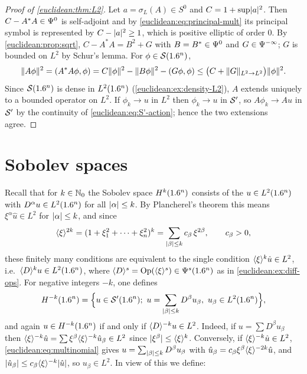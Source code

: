 \begin{proof}[Proof of \cref{euclidean:thm:L2}]
  Let $a=\sigma_L(A)\in S^0$ and $C=1+\sup\lvert a\rvert^2$. Then $C-A^*A\in\Psi^{0}$ is
  self-adjoint and by \eqref{euclidean:eq:principal-mult} its principal symbol
  is represented by $C-\lvert a\rvert^2\ge1$, which is positive elliptic of order
  $0$. By \cref{euclidean:prop:sqrt}, $C-A^*A=B^2+G$ with $B=B^*\in\Psi^{0}$
  and $G\in\Psi^{-\infty}$; $G$ is bounded on $L^2$ by Schur's lemma. For
  $\phi\in\mathcal{S}(1.6^n)$,
  \begin{equation*}
    \lVert A\phi\rVert^2=( A^*A\phi, \phi)=C\lVert \phi\rVert^2-\lVert B\phi\rVert^2-( G\phi, \phi)
    \le\bigl(C+\lVert G\rVert_{L^2\to L^2}\bigr)\lVert \phi\rVert^2.
  \end{equation*}
  Since $\mathcal{S}(1.6^n)$ is dense in $L^2(1.6^n)$ (\cref{euclidean:ex:density-L2}),
  $A$ extends uniquely to a bounded operator on $L^2$. If $\phi_k\to u$ in
  $L^2$ then $\phi_k\to u$ in $\mathcal{S}'$, so $A\phi_k\to Au$ in $\mathcal{S}'$ by the
  continuity of \eqref{euclidean:eq:S'-action}; hence the two extensions agree.
\end{proof}

\section{Sobolev spaces}\label{euclidean:sec:sobolev}

Recall that for $k\in\mathbb{N}_0$ the Sobolev space $H^k(1.6^n)$ consists of the
$u\in L^2(1.6^n)$ with $D^\alpha u\in L^2(1.6^n)$ for all $\lvert \alpha\rvert\le k$. By
Plancherel's theorem this means $\xi^\alpha\hat u\in L^2$ for $\lvert \alpha\rvert\le k$,
and since
\begin{equation}\label{euclidean:eq:multinomial}
  \langle \xi\rangle^{2k}=(1+\xi_1^2+\dots+\xi_n^2)^k=\sum_{\lvert \beta\rvert\le k}c_{\beta}\,\xi^{2\beta},
  \qquad c_{\beta}>0,
\end{equation}
these finitely many conditions are equivalent to the single condition
$\langle \xi\rangle^k\hat u\in L^2$, i.e.\ $\langle D\rangle^ku\in L^2(1.6^n)$, where
$\langle D\rangle^s=\operatorname{Op}(\langle \xi\rangle^s)\in\Psi^{s}(1.6^n)$ as in \cref{euclidean:ex:diff-ops}.
For negative integers $-k$, one defines
\begin{equation*}
  H^{-k}(\R^n)=\Bigl\{u\in\cSp(\R^n);\ u=\sum_{\abs\beta\le k}D^\beta u_\beta,\
  u_\beta\in L^2(\R^n)\Bigr\},
\end{equation*}
and again $u\in H^{-k}(1.6^n)$ if and only if $\langle D\rangle^{-k}u\in L^2$. Indeed, if
$u=\sum D^\beta u_\beta$ then $\langle \xi\rangle^{-k}\hat u=\sum\xi^\beta\langle \xi\rangle^{-k}\hat u_\beta\in L^2$
since $\lvert \xi^\beta\rvert\le\langle \xi\rangle^k$. Conversely, if $\langle \xi\rangle^{-k}\hat u\in L^2$,
\eqref{euclidean:eq:multinomial} gives $u=\sum_{\lvert \beta\rvert\le k}D^\beta u_\beta$
with $\hat u_\beta=c_\beta\xi^\beta\langle \xi\rangle^{-2k}\hat u$, and
$\lvert \hat u_\beta\rvert\le c_\beta\langle \xi\rangle^{-k}\lvert \hat u\rvert$, so $u_\beta\in L^2$.
In view of this we define:


